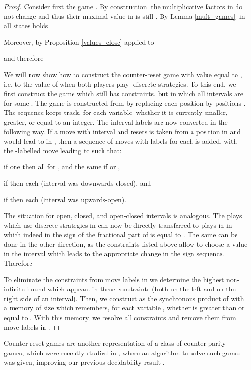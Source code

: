 \documentclass[fleqn,envcountsame]{LMCS}
\begin{document}
\begin{proof}
Consider first the game .
By construction, the multiplicative factors in  do not
change and thus their maximal value in  is still .
By Lemma \ref{mult_games}, in all states  holds

Moreover, by Proposition \ref{values_close} applied to 

and therefore


We will now show how to construct the counter-reset game  with value equal to
,
i.e. to the value of  when both players play -discrete strategies.
To this end, we first construct the game  which still has constraints, but
in which all intervals are  for some . The game  is
constructed from  by replacing each position  by  positions .
The sequence  keeps track, for each variable, whether
it is currently smaller, greater, or equal to an integer. The interval labels are now
converted in the following way. If a move with interval  and resets  is taken
from a position  in  and would lead to  in , then
a sequence of moves with labels  for each  is added,
with the -labelled move leading to  such that:
\begin{iteMize}{}
\item if one  then all  for , and the same if  or ,
\item if  then each  (interval was downwards-closed), and
\item if  then each  (interval was upwards-open). 
\end{iteMize}
The situation for open, closed, and open-closed intervals is analogous.
The plays which use discrete strategies in  can now be directly
transferred to plays in  in which indeed in 
the sign of the fractional part of  is equal to . The same
can be done in the other direction, as the constraints listed above
allow to choose a value in the interval which leads to the appropriate
change in the sign sequence. Therefore 


To eliminate the constraints from move labels in  we
determine the highest non-infinite bound  which appears in these
constraints (both on the left and on the right side of an interval).
Then, we construct  as the synchronous product of 
with a memory of size  which remembers, for each variable ,
whether  is greater than  or equal to . With
this memory, we resolve all constraints and remove them from move labels
in .
\end{proof}

Counter reset games are another representation of a class of counter parity
games, which were recently studied in \cite{BKL12}, where an algorithm to solve
such games was given, improving our previous decidability result \cite{FK11}.
\end{document}
